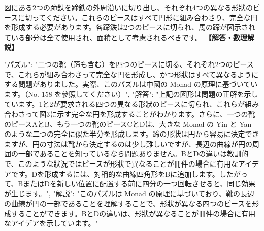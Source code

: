 \documentclass[10pt,a4paper,oneside,openany]{ltjsbook}
\begin{document}
\begin{tcolorbox}[colback=softblue,colframe=primaryblue,title=\textbf{第 160 問：THE TWO HORSESHOES.},arc=2mm,boxrule=1pt,breakable]
図にある2つの蹄鉄を蹄鉄の外周沿いに切り出し、それぞれ4つの異なる形狀のピースに切ってください。これらのピースはすべて円形に組み合わさり、完全な円を形成する必要があります。各蹄鉄は2つのピースに切られ、馬の蹄が図示されている部分は全て使用され、面積として考慮されるべきです。
\tcblower
\textbf{【解答・数理解説】}\par\vspace{0.3em}
{
"パズル": "二つの靴（蹄も含む）を四つのピースに切る、それぞれ2つのピースで、これらが組み合わさって完全な円を形成し、かつ形狀はすべて異なるようにする問題がありました。実際、このパズルは中國の Monad の原理に基づいています。（No. 158 を參照してください）",
"解答": "上記の図形は問題の正解を示しています。1と2が要求される四つの異なる形狀のピースに切られ、これらが組み合わさって図3に示す完全な円を形成することがわかります。さらに、一つの靴のピースAとB、もう一つの靴のピースCとDは、大きな Monad の Yin と Yan のような二つの完全に似た半分を形成します。蹄の形狀は円から容易に決定できますが、円の寸法は靴から決定するのは少し難しいですが、長辺の曲線が円の周囲の一部であることを知っているなら問題ありません。BとDの違いは教訓的で、このような狀況ではピースが形狀で異なることが冊件の場合に有用なアイデアです。Dを形成するには、対稱的な曲線四角形をBに追加します。したがって、BまたはDを新しい位置に配置する前に四分の一つ回転させると、同じ効果が生じます。",
"解説": "このパズルは Monad の原理に基づいており、靴の長辺の曲線が円の一部であることを理解することで、形狀が異なる四つのピースを形成することができます。BとDの違いは、形狀が異なることが冊件の場合に有用なアイデアを示しています。"
}
\end{tcolorbox}
\end{document}
